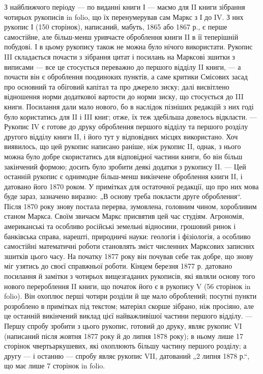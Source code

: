 З найближчого періоду — по виданні книги І — маємо для II книги зібрання
чотирьох рукописів in folio, що їх перенумерував сам Маркс з
І до IV. З них рукопис І (150 сторінок), написаний, мабуть, 1865 або
1867 р., є перше самостійне, але більш-менш уривчасте оброблення
книги II в її теперішній побудові. І в цьому рукопису також не можна
було нічого використати. Рукопис III складається почасти з зібрання
цитат і посилань на Марксові зшитки з виписами — все це стосується переважно
до першого відділу II книги, — а почасти він є оброблення поодиноких
пунктів, а саме критики Смісових засад про основний та обіговий
капітал та про джерело зиску; далі висвітлено відношення норми
додаткової вартости до норми зиску, що стосується до III книги. Посилання
дали мало нового, бо в наслідок пізніших редакцій з них годі
було користатись для II і III книг; отже, їх теж здебільша довелось відкласти.
— Рукопис IV є готове до друку оброблення першого відділу та
першого розділу другого відділу книги II, і його тут у відповідних місцях
використано. Хоч виявилось, що цей рукопис написано раніше, ніж
рукопис II, однак, з нього можна було добре скористатись для відповідної
частини книги, бо він більш закінчений формою; досить було
зробити деякі додатки з рукопису II. — Цей останній рукопис є однимодне
більш-менш викінчене оброблення книги II, і датовано його
1870 роком. У примітках для остаточної редакції, що про них мова
буде зараз, зазначено виразно: „В основу треба покласти друге оброблення“.
Після 1870 року знову постала перерва, зумовлена, головним чином,
хоробливим станом Маркса. Своїм звичаєм Маркс присвятив цей час
студіям. Агрономія, американські та особливо російські земельні відносини,
грошовий ринок і банківська справа, нарешті, природничі науки:
геологія і фізіологія, а особливо самостійні математичні роботи становлять
зміст численних Марксових записних зшитків цього часу. На початку
1877 року він почував себе так добре, що знову міг узятись
до своєї справжньої роботи. Кінцем березня 1877 р. датовано посилання
й замітки з чотирьох вищезгаданих рукописів, які являли основу
того нового перероблення II книги, що початок його є в рукопису V
(56 сторінок in folio). Він охоплює перші чотири розділи й ще мало
оброблений; посутні пункти розроблено в примітках під текстом; матеріял
скорше зібрано, ніж просіяно, але це останній викінчений виклад цієї найважливішої
частини першого відділу. — Першу спробу зробити з цього
рукопис, готовий до друку, являє рукопис VI (написаний після жовтня
1877 року й до липня 1878 року); в ньому лише 17 сторінок чвертьаркушевих,
які охоплюють більшу частину першого розділу; а другу — і
останню — спробу являє рукопис VII, датований „2 липня 1878 р.“, що
має лише 7 сторінок in folio.

